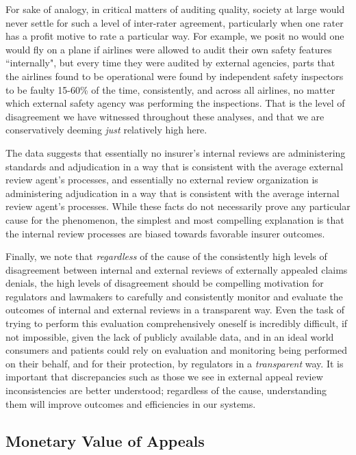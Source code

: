 \documentclass[12pt, a4paper,twoside]{report}
\theoremstyle{plain} %
\theoremstyle{definition} %
\theoremstyle{remark} %
\numberwithin{equation}{chapter}
\begin{document}
		For sake of analogy, in critical matters of auditing quality, society at large would never settle for such a level of inter-rater agreement, particularly when one rater has a profit motive to rate a particular way. For example, we posit no would one would fly on a plane if airlines were allowed to audit their own safety features ``internally", but every time they were audited by external agencies, parts that the airlines found to be operational were found by independent safety inspectors to be faulty 15-60\% of the time, consistently, and across all airlines, no matter which external safety agency was performing the inspections. That is the level of disagreement we have witnessed throughout these analyses, and that we are conservatively deeming \emph{just} relatively high here.
		
		The data suggests that essentially no insurer's internal reviews are administering standards and adjudication in a way that is consistent with the average external review agent's processes, and essentially no external review organization is administering adjudication in a way that is consistent with the average internal review agent's processes. While these facts do not necessarily prove any particular cause for the phenomenon, the simplest and most compelling explanation is that the internal review processes are biased towards favorable insurer outcomes.
		
		Finally, we note that \emph{regardless} of the cause of the consistently high levels of disagreement between internal and external reviews of externally appealed claims denials, the high levels of disagreement should be compelling motivation for regulators and lawmakers to carefully and consistently monitor and evaluate the outcomes of internal and external reviews in a transparent way. Even the task of trying to perform this evaluation comprehensively oneself is incredibly difficult, if not impossible, given the lack of publicly available data, and in an ideal world consumers and patients could rely on evaluation and monitoring being performed on their behalf, and for their protection, by regulators in a \emph{transparent} way. It is important that discrepancies such as those we see in external appeal review inconsistencies are better understood; regardless of the cause, understanding them will improve outcomes and efficiencies in our systems. 
		
		\subsection{Monetary Value of Appeals}
		
\end{document}

